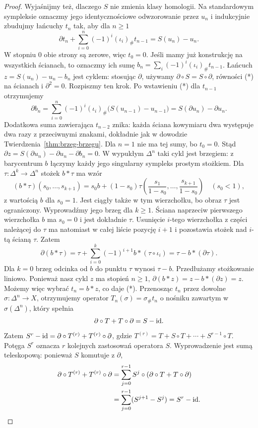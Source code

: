 \begin{proof}
Wyjaśnijmy też, dlaczego $S$ nie zmienia
klasy homologii. Na standardowym sympleksie
oznaczmy jego identycznościowe odwzorowanie
przez $u_n$ i indukcyjnie zbudujmy
łańcuchy $t_n$ tak, aby dla $n\geq1$
\[
 \partial t_n+\sum_{i=0}^n(-1)^i(\iota_i)_\#t_{n-1}
       =S(u_n)-u_n. \tag{*}
\]
W stopniu $0$ obie strony są zerowe,
więc $t_0=0$. Jeśli mamy już konstrukcję
na wszystkich ścianach, to oznaczmy ich sumę
$b_n=\sum_i(-1)^i(\iota_i)_\#t_{n-1}$.
Łańcuch $z=S(u_n)-u_n-b_n$
jest cyklem: stosując $\partial$,
używamy $\partial\circ S=S\circ\partial$,
równości (*) na ścianach
i $\partial^2=0$.
Rozpiszmy ten krok. Po wstawieniu (*) dla $t_{n-1}$
otrzymujemy
\[
 \partial b_n
 =\sum_{i=0}^n(-1)^i(\iota_i)_\#
       \bigl(S(u_{n-1})-u_{n-1}\bigr)
 =S(\partial u_n)-\partial u_n.
\]
Dodatkowa suma zawierająca $t_{n-2}$ znika:
każda ściana kowymiaru dwa występuje dwa razy
z przeciwnymi znakami, dokładnie jak w dowodzie
Twierdzenia~\ref{thm:brzeg-brzegu}. Dla $n=1$ nie ma tej sumy,
bo $t_0=0$. Stąd
$\partial z=S(\partial u_n)-\partial u_n-\partial b_n=0$.
W wypukłym $\Delta^n$ taki cykl jest
brzegiem: z barycentrum $b$ łączymy
każdy jego singularny sympleks prostym
stożkiem. Dla $\tau:\Delta^k\to\Delta^n$ stożek $b*\tau$
ma wzór
\[
 (b*\tau)(s_0,\ldots,s_{k+1})
 =s_0b+(1-s_0)\tau\left(\frac{s_1}{1-s_0},\ldots,
                         \frac{s_{k+1}}{1-s_0}\right)
 \quad(s_0<1),
\]
z wartością $b$ dla $s_0=1$. Jest ciągły także w tym wierzchołku,
bo obraz $\tau$ jest ograniczony.
Wyprowadźmy jego brzeg dla $k\geq1$. Ściana naprzeciw
pierwszego wierzchołka $b$ ma $s_0=0$ i jest dokładnie $\tau$.
Usunięcie $i$-tego wierzchołka z części należącej do $\tau$
ma natomiast w całej liście pozycję $i+1$
i pozostawia stożek nad $i$-tą ścianą $\tau$. Zatem
\[
 \partial(b*\tau)
 =\tau+\sum_{i=0}^k(-1)^{i+1}b*(\tau\circ\iota_i)
 =\tau-b*(\partial\tau).
\]
Dla $k=0$ brzeg odcinka od $b$ do punktu $\tau$
wynosi $\tau-b$. Przedłużamy stożkowanie liniowo.
Ponieważ nasz cykl $z$ ma stopień $n\geq1$,
$\partial(b*z)=z-b*(\partial z)=z$.
Możemy więc wybrać $t_n=b*z$, co daje (*).
Przenosząc $t_n$ przez dowolne
$\sigma:\Delta^n\to X$, otrzymujemy
operator $T_n(\sigma)=\sigma_\#t_n$ o nośniku zawartym
w $\sigma(\Delta^n)$, który spełnia
\[
 \partial\circ T+T\circ\partial=S-\mathrm{id}.
\]
Zatem $S^r-\mathrm{id}=\partial\circ T^{(r)}+
T^{(r)}\circ\partial$, gdzie
$T^{(r)}=T+S\circ T+\cdots+S^{r-1}\circ T$.
Potęga $S^r$ oznacza $r$ kolejnych zastosowań operatora $S$.
Wyprowadzenie jest sumą teleskopową: ponieważ $S$ komutuje z $\partial$,
\[
 \begin{aligned}
 \partial\circ T^{(r)}+T^{(r)}\circ\partial
 &=\sum_{j=0}^{r-1}S^j\circ(\partial\circ T+T\circ\partial)\\
 &=\sum_{j=0}^{r-1}(S^{j+1}-S^j)=S^r-\mathrm{id}.
 \end{aligned}
\]


\end{proof}
